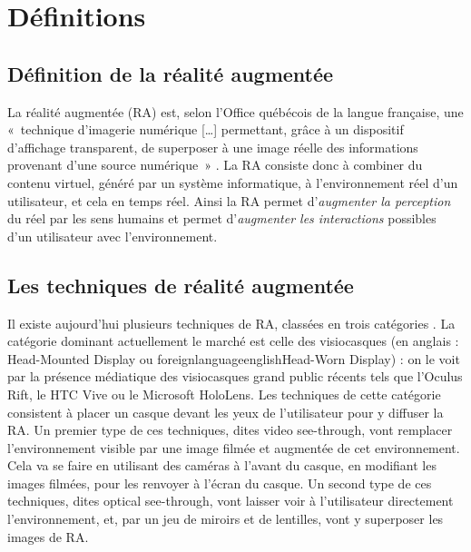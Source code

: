 \section{Définitions}
\subsection{Définition de la réalité augmentée}
La réalité augmentée (RA) est, selon l'Office québécois de la langue française, une «~technique d'imagerie numérique […] permettant, grâce à un dispositif d'affichage transparent, de superposer à une image réelle des informations provenant d'une source numérique~» \citep{OfficeQuebecoisLangueFrancaiseRA2015}. La RA consiste donc à combiner du contenu virtuel, généré par un système informatique, à l'environnement réel d'un utilisateur, et cela en temps réel. Ainsi la RA permet d'\emph{augmenter la perception} du réel par les sens humains et permet d'\emph{augmenter les interactions} possibles d'un utilisateur avec l'environnement. \citep{Azuma1997}


\subsection{Les techniques de réalité augmentée}

Il existe aujourd'hui plusieurs techniques de RA, classées en trois catégories . La catégorie dominant actuellement le marché est celle des visiocasques (en anglais : \foreignlanguage{english}{Head-Mounted Display} ou foreignlanguage{english}{Head-Worn Display}) \citep{VanKrevelenPoelman2010} : on le voit par la présence médiatique des visiocasques grand public récents tels que l'Oculus Rift, le HTC Vive ou le Microsoft HoloLens. Les techniques de cette catégorie consistent à placer un casque devant les yeux de l'utilisateur pour y diffuser la RA. Un premier type de ces techniques, dites \foreignlanguage{english}{video see-through}, vont remplacer l'environnement visible par une image filmée et augmentée de cet environnement. Cela va se faire en utilisant des caméras à l'avant du casque, en modifiant les images filmées, pour les renvoyer à l'écran du casque. Un second type de ces techniques, dites \foreignlanguage{english}{optical see-through}, vont laisser voir à l'utilisateur directement l'environnement, et, par un jeu de miroirs et de lentilles, vont y superposer les images de RA.

